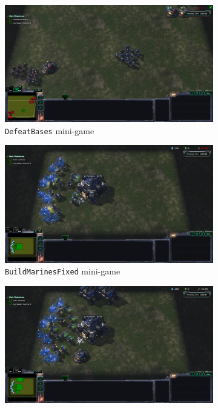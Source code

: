 \begin{figure}[t]
    \centering
    \begin{subfigure}[b]{0.45\textwidth}
        \includegraphics[width=1\textwidth]{figs/DefeatBases.png}
        \caption{\texttt{DefeatBases} mini-game}
        \label{fig:DefeatBases}
    \end{subfigure}
    \hfill
    \begin{subfigure}[b]{0.45\textwidth}
        \includegraphics[width=1\textwidth]{figs/BuildMarinesFixed.png}
        \caption{\texttt{BuildMarinesFixed} mini-game}
        \label{fig:BuildMarinesFixed}
    \end{subfigure}
    \hfill
    \begin{subfigure}[b]{0.45\textwidth}
        \includegraphics[width=1\textwidth]{figs/BuildMarinesRandom.png}

\end{subfigure}
\end{figure}
